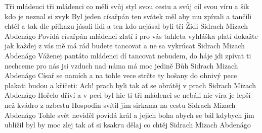 \begin{TEXT}{Tři mládenci}
\SLOKA {} tři mládenci co měli svůj styl\NL
{} svou cestu a  svůj cíl\NL
{} svou víru a  šik\NL
{} kdo je neznal  si zvyk\NL
{}   
\SLOKA Byl jeden císařpán ten svátek měl\NL
aby mu zpívali a tančili chtěl\NL
a tak dle příkazu jásali lidi\NL
a ten kdo nejásal byli tři Židi\NL
Sidrach Mizach Abdenágo
\SLOKA Povídá císařpán mládenci zlatí\NL
i pro vás tahleta vyhláška platí\NL
dokažte jak každej z vás mě má rád\NL
budete tancovat a ne sa vykrúcat\NL
Sidrach Mizach Abdenágo
\SLOKA Váženej pantáto mládenci dí\NL
tancovat nebudem, do háje jdi\NL
zpívat ti nechceme pro nás jsi vzduch\NL
nad náma má moc jedině Bůh\NL
Sidrach Mizach Abdenágo
\SLOKA Císař se namích a na tohle vece\NL
strčte ty hošany do ohnivý pece\NL
plakati budou a křičeti: Ach!\NL
prach byli tak ať se obrátěj v prach\NL
Sidrach Mizach Abdenágo
\SLOKA Hořelo dříví a v peci byl hic\NL
ti tři mládenci se nebáli nic\NL
víra je lepší než kvádro z azbestu\NL
Hospodin svítil jim sirkama na cestu\NL
Sidrach Mizach Abdenágo
\SLOKA Tohle svět neviděl povídá král\NL
a jejich boha abych se bál\NL
kdybych jim ublížil byl by moc zlej\NL
tak ať si ksakru dělaj co chtěj\NL
Sidrach Mizach Abdenágo
\end{TEXT}

